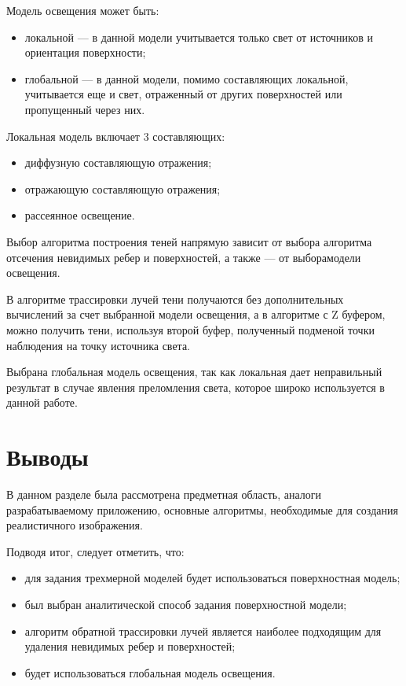 Модель освещения может быть:
\begin{itemize}
	\item локальной --- в данной модели учитывается только свет от источников и
	ориентация поверхности;
	\item глобальной --- в данной модели, помимо составляющих локальной, учитывается еще и свет, отраженный от других поверхностей или пропущенный через них.
\end{itemize}

Локальная модель включает 3 составляющих:

\begin{itemize}
	\item диффузную составляющую отражения;
	\item отражающую составляющую отражения;
	\item рассеянное освещение.
\end{itemize}

Выбор алгоритма построения теней напрямую зависит от выбора алгоритма отсечения невидимых ребер и поверхностей, а также --- от выборамодели освещения.

В алгоритме трассировки лучей тени получаются без дополнительных вычислений за счет выбранной модели освещения, а в алгоритме с Z буфером, можно получить тени, используя второй буфер, полученный подменой точки наблюдения на точку источника света.

Выбрана глобальная модель освещения, так как локальная дает неправильный результат в случае явления преломления света, которое широко используется в данной работе.

\newpage

\section{Выводы}
В данном разделе была рассмотрена предметная область, аналоги разрабатываемому приложению, основные алгоритмы, необходимые для создания реалистичного изображения. 

Подводя итог, следует отметить, что:
\begin{itemize}
	\item для задания трехмерной моделей будет использоваться поверхностная модель;
	\item был выбран аналитической способ задания поверхностной модели;
	\item алгоритм обратной трассировки лучей является наиболее подходящим для удаления невидимых ребер и поверхностей;
	\item будет использоваться глобальная модель освещения.
\end{itemize}


